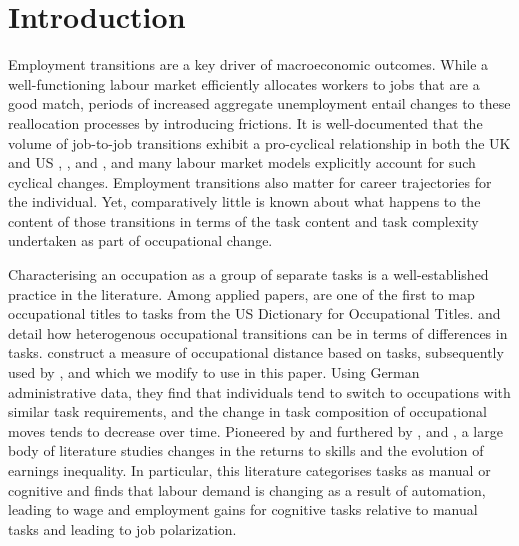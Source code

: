 \documentclass[12pt,authoryear]{elsarticle}
\begin{document}
	
	\newpage 
	\section{Introduction}
	\label{sec:Introduction}
	
	Employment transitions are a key driver of macroeconomic outcomes. While a well-functioning labour market efficiently allocates workers to jobs that are a good match, periods of increased aggregate unemployment entail changes to these reallocation processes by introducing frictions. It is well-documented that the volume of job-to-job transitions exhibit a pro-cyclical relationship in both the UK and US  \cite{Carrillo-Tudela2016},  \cite{MurphyTopel1987}, \cite{Moscarini2007} and \cite{Kambourov2008}, and many labour market models explicitly account for such cyclical changes. Employment transitions also matter for career trajectories for the individual. Yet, comparatively little is known about what happens to the content of those transitions in terms of the task content and task complexity undertaken as part of occupational change. 
	
		\vspace{2mm}
		
	Characterising an occupation as a group of separate tasks is a well-established practice in the literature. Among applied papers, \cite{Poletaev2008} are one of the first to map occupational titles to tasks from the US Dictionary for Occupational Titles. \cite{Gathmann2010} and \cite{Yamaguchi2010} detail how heterogenous occupational transitions can be in terms of differences in tasks. \cite{Gathmann2010} construct a measure of occupational distance based on tasks, subsequently used by \cite{robinson2018}, and which we modify to use in this paper. Using German administrative data, they find that individuals tend to switch to occupations with similar task requirements, and the change in task composition of occupational moves tends to decrease over time.  Pioneered by \cite{ALM2003} and furthered by \cite{AcemogluAutor2011}, \cite{AutorDorn2013}  and \cite{GoosManningSalomons2014}, a large body of literature studies changes in the returns to skills and the evolution of earnings inequality. In particular, this literature categorises tasks as manual or cognitive and finds that labour demand is changing as a result of automation, leading to wage and employment gains for cognitive tasks relative to manual tasks and leading to job polarization. 
		
\end{document}
